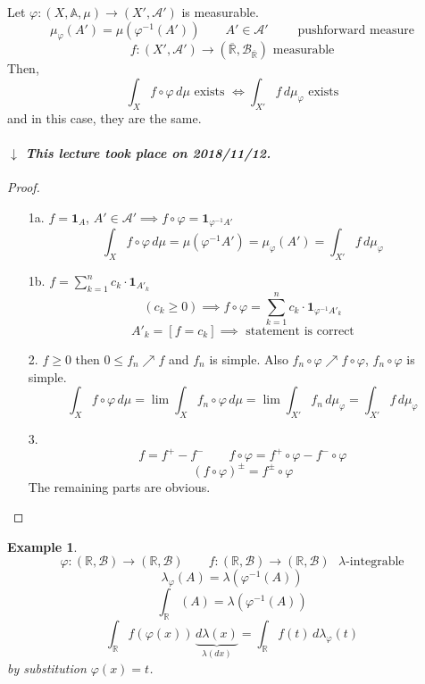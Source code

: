 \documentclass[a4paper]{article}
\newcounter{lecref}[section]
\numberwithin{lecref}{section}
\theoremstyle{break}
\newtheorem{example}[lecref]{Example}
\newcommand{\dateref}[1]{%
  \begin{mdframed}[backgroundcolor=gray!10,innerbottommargin=0pt,innertopmargin=0pt]
    \paragraph{\textit{$\downarrow$ This lecture took place on #1.}}%
  \end{mdframed}%
}
\begin{document}
\begin{theorem}
  Let $\varphi: (X, \mathbb A, \mu) \to (X', \mathcal A')$ is measurable.
  \[ \mu_{\varphi}(A') = \mu(\varphi^{-1}(A')) \qquad A' \in \mathcal A' \qquad \text{ pushforward measure} \]
  \[ f: (X', \mathcal A') \to (\overline{\mathbb R}, \mathcal B_{\overline{\mathbb R}}) \text{ measurable} \]
  Then,
  \[ \int_{X} f \circ \varphi \, d\mu \text{ exists } \iff \int_{X'} f \, d\mu_{\varphi} \text{ exists} \]
  and in this case, they are the same.
\end{theorem}

\dateref{2018/11/12}

\begin{proof}
  \begin{enumerate}
    \item[1a.] $f = \mathbf{1}_A$, $A' \in \mathcal A' \implies f \circ \varphi = \mathbf{1}_{\varphi^{-1} A'}$
      \[ \int_{X} f\circ \varphi \, d\mu = \mu(\varphi^{-1} A') = \mu_{\varphi}(A') = \int_{X'} f \, d\mu_{\varphi} \]
    \item[1b.] $f = \sum_{k=1}^n c_k \cdot \mathbf{1}_{A'_k}$
      \[ (c_k \geq 0) \implies f \circ \varphi = \sum_{k=1}^n c_k \cdot \mathbf{1}_{\varphi^{-1} A'_k} \]
      \[ A'_k = [f = c_k] \implies \text{ statement is correct} \]
    \item[2.]
      $f \geq 0$ then $0 \leq f_n \nearrow f$ and $f_n$ is simple.
      Also $f_n \circ \varphi \nearrow f \circ \varphi$, $f_n \circ \varphi$ is simple.
      \[ \int_X f \circ \varphi \, d\mu = \lim \int_X f_n \circ \varphi \, d\mu = \lim \int_{X'} f_n \, d\mu_{\varphi} = \int_{X'} f \, d\mu_{\varphi} \]
    \item[3.]
      \[ f = f^+ - f^- \qquad f \circ \varphi = f^+ \circ \varphi - f^- \circ \varphi \]
      \[ (f \circ \varphi)^{\pm} = f^{\pm} \circ \varphi \]
      The remaining parts are obvious.
  \end{enumerate}
\end{proof}

\begin{example}
  \[ \varphi: (\mathbb R, \mathcal B) \to (\mathbb R, \mathcal B) \qquad f: (\mathbb R, \mathcal B) \to (\mathbb R, \mathcal B) \text{ $\lambda$-integrable} \]
  \[ \lambda_{\varphi}(A) = \lambda(\varphi^{-1}(A)) \]
  \[ \int_{\mathbb R} (A) = \lambda(\varphi^{-1}(A)) \]
  \[ \int_{\mathbb R} f(\varphi(x)) \, \underbrace{d\lambda(x)}_{\lambda(dx)} = \int_{\mathbb R} f(t) \, d\lambda_{\varphi}(t) \]
  by substitution $\varphi(x) = t$.
\end{example}
\end{document}
